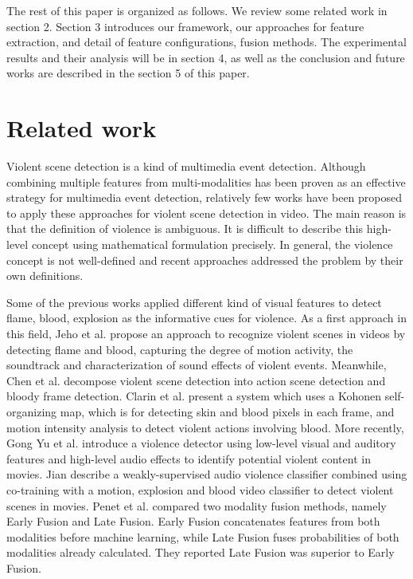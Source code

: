 \documentclass[twocolumn]{bmcart}%
\begin{document}
The rest of this paper is organized as follows. We review some related work in section 2. Section 3 introduces our framework, our approaches for feature extraction, and detail of feature configurations, fusion methods. The experimental results and their analysis will be in section 4, as well as the conclusion and future works are described in the section 5 of this paper.
\section{Related work}
Violent scene detection is a kind of multimedia event detection. Although combining multiple features from multi-modalities has been proven as an effective strategy for multimedia event detection, relatively few works have been proposed to apply these approaches for violent scene detection in video. The main reason is that the definition of violence is ambiguous. It is difficult to describe this high-level concept using mathematical formulation precisely. In general, the violence concept is not well-defined and recent approaches addressed the problem by their own definitions.

Some of the previous works applied different kind of visual features to detect flame, blood, explosion as the informative cues for violence. As a first approach in this field, Jeho et al.\cite{nam1998audio} propose an approach to recognize violent scenes in videos by detecting flame and blood, capturing the degree of motion activity, the soundtrack and characterization of sound effects of violent events. Meanwhile, Chen et al.\cite{2} decompose violent scene detection into action scene detection and bloody frame detection. Clarin et al.\cite{3} present a system which uses a Kohonen self-organizing map, which is for detecting skin and blood pixels in each frame, and motion intensity analysis to detect violent actions involving blood. More recently, Gong Yu et al.\cite{11} introduce a violence detector using low-level visual and auditory features and high-level audio effects to identify potential violent content in movies. Jian \cite{17} describe a weakly-supervised audio violence classifier combined using co-training with a motion, explosion and blood video classifier to detect violent scenes in movies. Penet et al.\cite{21} compared two modality fusion methods, namely Early Fusion and Late Fusion. Early Fusion concatenates features from both modalities before machine learning, while Late Fusion fuses probabilities of both modalities already calculated. They reported Late Fusion was superior to Early Fusion.
\end{document}
